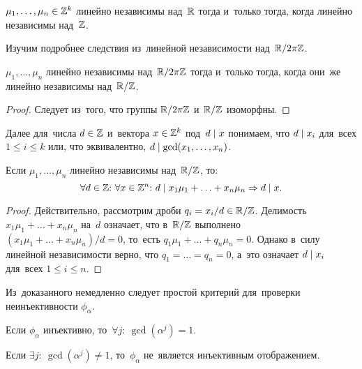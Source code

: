 \documentclass[a4paper,oneside]{article}
\begin{document}
\begin{consequence*}
  $\mu_1, \ldots, \mu_n \in \mathbb{Z}^k$ линейно независимы над~$\mathbb{R}$ тогда и~только тогда, когда линейно независимы над~$\mathbb{Z}$.
\end{consequence*}

Изучим подробнее следствия из~линейной независимости над~$\mathbb{R} / 2 \pi \mathbb{Z}$.

\begin{statement*}
  $\mu_1, \ldots, \mu_n$ линейно независимы над~$\mathbb{R} / 2 \pi \mathbb{Z}$
  тогда и~только тогда, когда они~же линейно независимы над~$\mathbb{R} / \mathbb{Z}$.
\end{statement*}

\begin{proof}
  Следует из~того, что группы $\mathbb{R} / 2 \pi \mathbb{Z}$ и~$\mathbb{R} / \mathbb{Z}$ изоморфны.
\end{proof}

Далее для~числа $d \in \mathbb{Z}$ и~вектора $x \in \mathbb{Z}^k$ под~$d \mid x$ понимаем, что $d \mid x_i$ для~всех $1 \leq i \leq k$
или, что эквивалентно, $d \mid \gcd(x_1, \ldots, x_n)$.

\begin{lemma*}
  Если $\mu_1, \ldots, \mu_n$ линейно независимы над~$\mathbb{R} / \mathbb{Z}$, то:
  \[
    \forall d \in \Z{:}\ \forall x \in \Z^n{:}\ d \divides x_1 \mu_1 + \ldots + x_n \mu_n \Rightarrow d \divides x.
  \]
\end{lemma*}

\begin{proof}
  Действительно, рассмотрим дроби $q_i = x_i / d \in \mathbb{R} / \mathbb{Z}$. Делимость $x_1 \mu_1 + \ldots + x_n \mu_n$ на~$d$ означает,
  что в~$\mathbb{R} / \mathbb{Z}$ выполнено $(x_1 \mu_1 + \ldots + x_n \mu_n) / d = 0$, то~есть $q_1 \mu_1 + \ldots + q_n \mu_n = 0$.
  Однако в~силу линейной независимости верно, что $q_1 = \ldots = q_n = 0$, а~это означает $d \mid x_i$ для~всех $1 \leq i \leq n$.
\end{proof}

Из~доказанного немедленно следует простой критерий для~проверки неинъективности $\phi_\alpha$.

\begin{lemma*}
  Если $\phi_\alpha$ инъективно, то~$\forall j{:}\ \gcd(\alpha^j) = 1$.
\end{lemma*}

\begin{consequence*}
  Если $\exists j{:}\ \gcd(\alpha^j) \neq 1$, то~$\phi_\alpha$ не~является инъективным отображением.
\end{consequence*}
\end{document}
